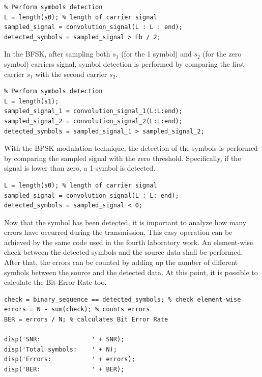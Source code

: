 \begin{lstlisting}
% Perform symbols detection
L = length(s0); % length of carrier signal
sampled_signal = convolution_signal(L : L : end);
detected_symbols = sampled_signal > Eb / 2;
\end{lstlisting}

\noindent In the BFSK, after sampling both $s_1$ (for the 1 symbol) and $s_2$ (for the zero symbol) carriers signal, symbol detection is performed by comparing the first carrier $s_1$ with the second carrier $s_2$. 

\begin{lstlisting}
% Perform symbols detection
L = length(s1);
sampled_signal_1 = convolution_signal_1(L:L:end);
sampled_signal_2 = convolution_signal_2(L:L:end);
detected_symbols = sampled_signal_1 > sampled_signal_2;
\end{lstlisting}

\noindent With the BPSK modulation technique, the detection of the symbols is performed by comparing the sampled signal with the zero threshold. Specifically, if the signal is lower than zero, a 1 symbol is detected. 

\begin{lstlisting}
L = length(s0); % length of carrier signal
sampled_signal = convolution_signal(L : L: end);
detected_symbols = sampled_signal < 0;
\end{lstlisting}

\vspace{10px}\noindent Now that the symbol has been detected, it is important to analyze how many errors have occurred during the transmission. This easy operation can be achieved by the same code used in the fourth laboratory work. An element-wise check between the detected symbols and the source data shall be performed. After that, the errors can be counted by adding up the number of different symbols between the source and the detected data. At this point, it is possible to calculate the Bit Error Rate too.

\begin{lstlisting}
check = binary_sequence == detected_symbols; % check element-wise
errors = N - sum(check); % counts errors
BER = errors / N; % calculates Bit Error Rate

disp('SNR:              ' + SNR);
disp('Total symbols:    ' + N);
disp('Errors:           ' + errors);
disp('BER:              ' + BER);
\end{lstlisting}

